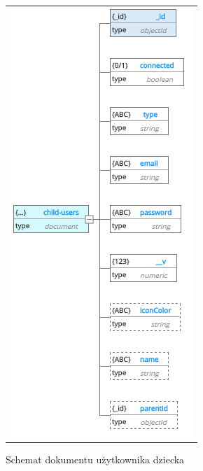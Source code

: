 \documentclass{sprawozdanie-agh}
\begin{document}
			\begin{figure}[H] 
				\centering 
				\begin{tabular}{c}
					\includegraphics[]{childUser.png} 
				\end{tabular} 
				\caption{Schemat dokumentu użytkownika dziecka}
			\end{figure}
\end{document}
